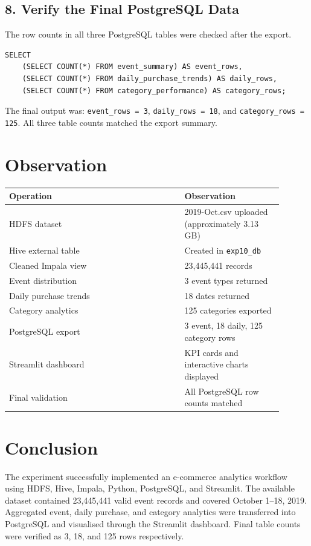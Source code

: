\documentclass[11pt,a4paper]{article}
\begin{document}
\subsection{8. Verify the Final PostgreSQL Data}
The row counts in all three PostgreSQL tables were checked after the export.

\begin{lstlisting}[style=terminalstyle]
SELECT
    (SELECT COUNT(*) FROM event_summary) AS event_rows,
    (SELECT COUNT(*) FROM daily_purchase_trends) AS daily_rows,
    (SELECT COUNT(*) FROM category_performance) AS category_rows;
\end{lstlisting}

The final output was: \texttt{event\_rows = 3}, \texttt{daily\_rows = 18}, and \texttt{category\_rows = 125}. All three table counts matched the export summary.

\section{Observation}
\begin{center}
\begin{tabular}{>{\raggedright\arraybackslash}p{0.58\linewidth}p{0.32\linewidth}}
\toprule
\textbf{Operation} & \textbf{Observation} \\
\midrule
HDFS dataset & 2019-Oct.csv uploaded (approximately 3.13 GB) \\
Hive external table & Created in \texttt{exp10\_db} \\
Cleaned Impala view & 23,445,441 records \\
Event distribution & 3 event types returned \\
Daily purchase trends & 18 dates returned \\
Category analytics & 125 categories exported \\
PostgreSQL export & 3 event, 18 daily, 125 category rows \\
Streamlit dashboard & KPI cards and interactive charts displayed \\
Final validation & All PostgreSQL row counts matched \\
\bottomrule
\end{tabular}
\end{center}

\section{Conclusion}
The experiment successfully implemented an e-commerce analytics workflow using HDFS, Hive, Impala, Python, PostgreSQL, and Streamlit. The available dataset contained 23,445,441 valid event records and covered October 1--18, 2019. Aggregated event, daily purchase, and category analytics were transferred into PostgreSQL and visualised through the Streamlit dashboard. Final table counts were verified as 3, 18, and 125 rows respectively.
\end{document}
